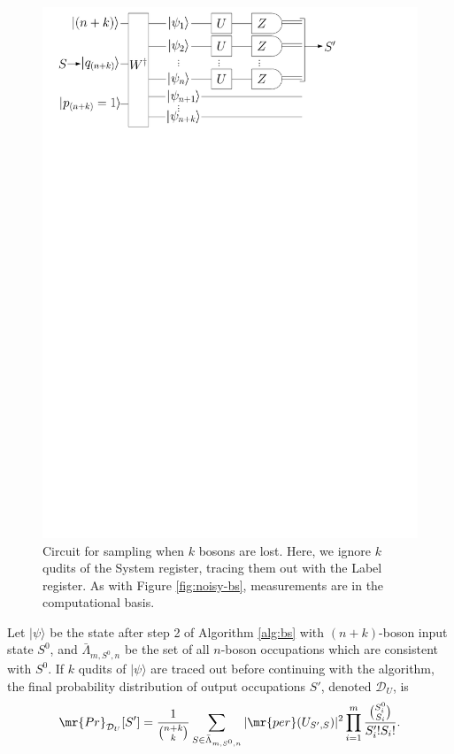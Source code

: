 \begin{figure}
\includegraphics[width=\linewidth]{noisy_circuit/lost_circuit}
\caption[Circuit for sampling when $k$ bosons are lost]{Circuit for sampling when $k$ bosons are lost. 
Here, we ignore $k$ qudits of the System register, tracing them out with the Label register. 
As with Figure \ref{fig:noisy-bs}, measurements are in the computational basis.}
\label{fig:lost-bs}
\end{figure}

\begin{theorem}
Let $|\psi\rangle$ be the state after step 2 of Algorithm \ref{alg:bs} with $(n+k)$-boson input state $S^0$, and $\bar{\Lambda}_{m,S^0,n}$ be the set of all $n$-boson occupations which are consistent with $S^0$.
If $k$ qudits of $|\psi\rangle$ are traced out before continuing with the algorithm, the final probability distribution of output occupations $S'$, denoted $\mathcal{D}_U$, is
\begin{equation}
\mr{Pr}_{\mathcal{D}_U}[S'] = \frac{1}{\binom{n+k}{k}}\sum_{S \in \bar{\Lambda}_{m,S^0,n}} |\mr{per}(U_{S',S})|^2 \prod_{i=1}^m \frac{\binom{S_i^0}{S_i}}{S'_i! S_i!} .
\end{equation}
\end{theorem}

